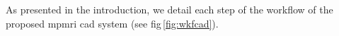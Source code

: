 \documentclass[a4paper,num-refs]{wiley-article}
\begin{document}





As presented in the introduction, we detail each step of the workflow of the
proposed \ac{mpmri} \ac{cad} system (see \acs{fig}\,\ref{fig:wkfcad}).
\end{document}
